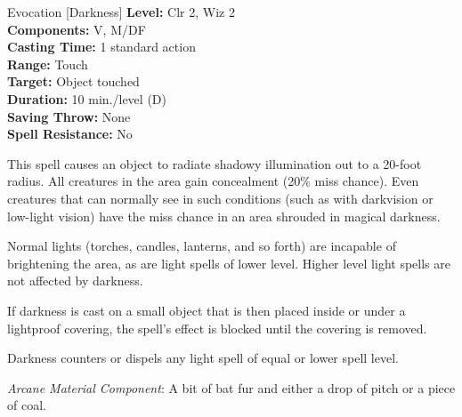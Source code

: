 {Evocation [Darkness]}
{
	\textbf{Level:}
	Clr 2, Wiz 2\\
	\textbf{Components:}
	V, M/DF\\
	\textbf{Casting Time:}
	1 standard action\\
	\textbf{Range:}
	Touch\\
	\textbf{Target:}
	Object touched\\
	\textbf{Duration:}
	10 min./level (D)\\
	\textbf{Saving Throw:}
	None\\
	\textbf{Spell Resistance:}
	No\\
}
{
	This spell causes an object to radiate shadowy illumination out to a 20-foot radius. All creatures in the area gain concealment (20\% miss chance). Even creatures that can normally see in such conditions (such as with darkvision or low-light vision) have the miss chance in an area shrouded in magical darkness.

	Normal lights (torches, candles, lanterns, and so forth) are incapable of brightening the area, as are light spells of lower level. Higher level light spells are not affected by darkness.

	If darkness is cast on a small object that is then placed inside or under a lightproof covering, the spell's effect is blocked until the covering is removed.

	Darkness counters or dispels any light spell of equal or lower spell level.

	\textit{Arcane Material Component}:
	A bit of bat fur and either a drop of pitch or a piece of coal.

}
